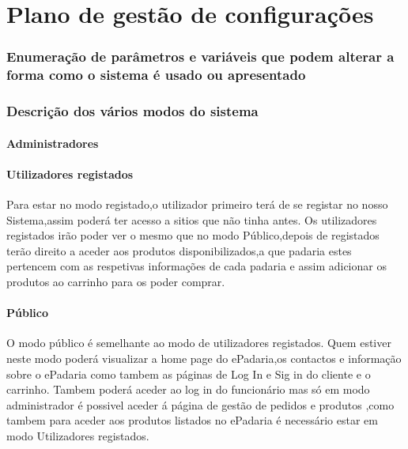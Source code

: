 \chapter{Plano de gestão de configurações}
\label{plano_de_gestao_de_configuracoes}

\subsection{Enumeração de parâmetros e variáveis que podem alterar a forma como o sistema é usado ou apresentado}

\subsection{Descrição dos vários modos do sistema}
\subsubsection{Administradores}
\subsubsection{Utilizadores registados}
Para estar no modo registado,o utilizador primeiro terá de se registar no nosso Sistema,assim poderá ter acesso a sitios que não tinha antes. Os utilizadores registados irão poder ver o mesmo que no modo Público,depois de registados terão direito a aceder aos produtos disponibilizados,a que padaria estes pertencem com as respetivas informações de cada padaria e assim adicionar os produtos ao carrinho para os poder comprar.
\subsubsection{Público}
O modo público é semelhante ao modo de utilizadores registados. Quem estiver neste modo poderá visualizar a home page do ePadaria,os contactos e informação sobre o ePadaria como tambem as páginas de Log In e Sig in do cliente e o carrinho. Tambem poderá aceder ao log in do funcionário mas só em modo administrador é possivel aceder á página de gestão de pedidos e produtos ,como tambem para aceder aos produtos listados no ePadaria é necessário estar em modo Utilizadores registados.
